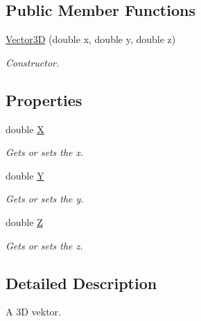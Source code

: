 \subsection*{Public Member Functions}
\begin{DoxyCompactItemize}
\item 
\hyperlink{class_a_rdev_kit_1_1_model_1_1_project_1_1_vector3_d_a5ea9d8ecfcfaefa8b7283febc2a94d4a}{Vector3\-D} (double x, double y, double z)
\begin{DoxyCompactList}\small\item\em Constructor. \end{DoxyCompactList}\end{DoxyCompactItemize}
\subsection*{Properties}
\begin{DoxyCompactItemize}
\item 
double \hyperlink{class_a_rdev_kit_1_1_model_1_1_project_1_1_vector3_d_a06336e90ebe41a0d704d7fb968c3eab8}{X}
\begin{DoxyCompactList}\small\item\em Gets or sets the x. \end{DoxyCompactList}\item 
double \hyperlink{class_a_rdev_kit_1_1_model_1_1_project_1_1_vector3_d_aaa8679d7364c8f6ba03e89bd00f5b991}{Y}
\begin{DoxyCompactList}\small\item\em Gets or sets the y. \end{DoxyCompactList}\item 
double \hyperlink{class_a_rdev_kit_1_1_model_1_1_project_1_1_vector3_d_a75ca41666b67f93861f074e13964e946}{Z}
\begin{DoxyCompactList}\small\item\em Gets or sets the z. \end{DoxyCompactList}\end{DoxyCompactItemize}


\subsection{Detailed Description}
A 3\-D vektor. 



